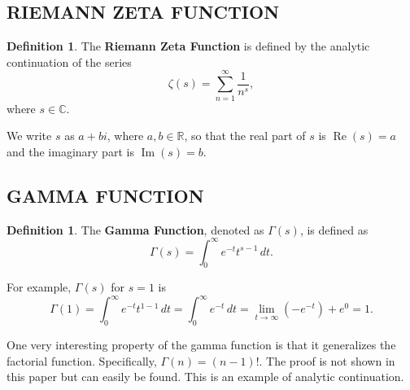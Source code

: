 \documentclass[12pt]{amsart} %
\theoremstyle{definition}
\newtheorem{definition}[thm]{Definition}
\theoremstyle{remark}
\numberwithin{equation}{section}
\begin{document}
\subsection{RIEMANN ZETA FUNCTION}
\begin{definition}
The \textbf{Riemann Zeta Function} is defined by the analytic continuation of the series
$$\zeta(s) = \sum_{n=1}^\infty \frac{1}{n^s},$$
where $s \in \mathbb{C}.$

We write $s$ as $a + bi$, where $a, b \in \mathbb{R}$, so that the real part of $s$ is $\operatorname{Re}(s) = a$ and the imaginary part is $\operatorname{Im}(s) = b$.
\end{definition}
\newpage
\subsection{GAMMA FUNCTION}
\begin{definition}
The \textbf{Gamma Function}, denoted as $\Gamma(s)$, is defined as
$$\Gamma(s) = \int_{0}^\infty e^{-t}t^{s-1} \, dt.$$

For example, $\Gamma(s)$ for $s = 1$ is
$$\Gamma(1) = \int_{0}^\infty e^{-t}t^{1-1} \, dt = \int_{0}^\infty e^{-t} \, dt = \lim_{t \to \infty} (-e^{-t}) + e^0 = 1.$$

One very interesting property of the gamma function is that it generalizes the factorial function. Specifically, $\Gamma(n) = (n-1)!$. The proof is not shown in this paper but can easily be found. This is an example of analytic continuation.
\end{definition}
\end{document}
